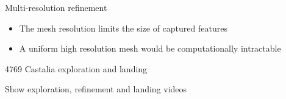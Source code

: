 \begin{frame}{Multi-resolution refinement}
    \begin{itemize}
        \item The mesh resolution limits the size of captured features
        \item A uniform high resolution mesh would be computationally intractable
    \end{itemize}
    \begin{center}%
    \end{center}
\end{frame}

\begin{frame}{4769 Castalia exploration and landing}
    \begin{center}
        Show exploration, refinement and landing videos
    \end{center}
\end{frame}

